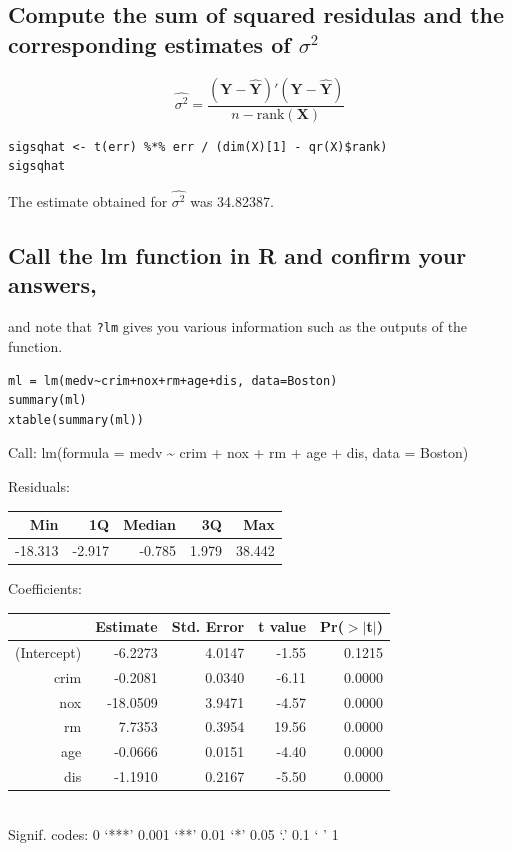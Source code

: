 \documentclass[11pt]{article}
\begin{document}
\subsection{Compute the sum of squared residulas and the corresponding estimates of $\sigma$$^2$}
\label{sec-4-6}


\[ \hat{\sigma^2} =
\frac{(\mathbf{Y}-\hat{\mathbf{Y}})'(\mathbf{Y}-\hat{\mathbf{Y}})}{n -
\text{rank}(\mathbf{X})}
\]


\begin{verbatim}
sigsqhat <- t(err) %*% err / (dim(X)[1] - qr(X)$rank)
sigsqhat
\end{verbatim}

The estimate obtained for $\hat{\sigma^2}$ was 34.82387.
\subsection{Call the lm function in R and confirm your answers,}
\label{sec-4-7}

and note that \verb~?lm~ gives you various information such as the outputs
of the function.


\begin{verbatim}
ml = lm(medv~crim+nox+rm+age+dis, data=Boston)
summary(ml)
xtable(summary(ml))
\end{verbatim}


Call:
lm(formula = medv \~{} crim + nox + rm + age + dis, data = Boston)

\begin{table}[ht]
\centering
Residuals:\\
\begin{tabular}{rrrrr}
\hline
    Min   &   1Q &   Median &      3Q  &     Max\\
\hline 
-18.313  & -2.917 &  -0.785 &   1.979 &  38.442 \\
\hline
\end{tabular}
\end{table}

\begin{table}[ht]
\centering
Coefficients:\\
\begin{tabular}{rrrrr}
  \hline
 & Estimate & Std. Error & t value & Pr($>$$|$t$|$) \\ 
  \hline
(Intercept) & -6.2273 & 4.0147 & -1.55 & 0.1215 \\ 
  crim & -0.2081 & 0.0340 & -6.11 & 0.0000 \\ 
  nox & -18.0509 & 3.9471 & -4.57 & 0.0000 \\ 
  rm & 7.7353 & 0.3954 & 19.56 & 0.0000 \\ 
  age & -0.0666 & 0.0151 & -4.40 & 0.0000 \\ 
  dis & -1.1910 & 0.2167 & -5.50 & 0.0000 \\ 
   \hline
\end{tabular}\\
Signif. codes:  0 ‘***’ 0.001 ‘**’ 0.01 ‘*’ 0.05 ‘.’ 0.1 ‘ ’ 1
\end{table}
\end{document}
